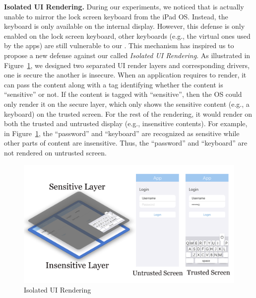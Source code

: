 \textbf{Isolated \ac{UI} Rendering.} During our experiments, we noticed that \tool
is actually unable to mirror the lock screen keyboard from the iPad
OS. Instead, the keyboard is only available on the internal display. However,
this defense is only enabled on the lock screen keyboard, other keyboards
(e.g., the virtual ones used by the apps) are still vulnerable to our \tool.
This mechanism has inspired us to propose a new defense against our \tool
called \emph{Isolated \ac{UI} Rendering}. As illustrated in
Figure~\ref{fig:isolated_ui}, we designed two separated \ac{UI} render layers and corresponding drivers, one
is secure the another is insecure. When an application requires to render, it can
pass the content along with a tag identifying whether the content is
``sensitive'' or not. If the content is tagged with ``sensitive'', then the OS
could only render it on the secure layer, which only shows the sensitive content
(e.g., a keyboard) on the trusted screen. For the rest of the rendering, it
would render on both the trusted and untrusted display (e.g., insensitive
contents).
For example, in Figure~\ref{fig:isolated_ui}, the ``password'' and ``keyboard'' are recognized as sensitive while other parts of content are insensitive. Thus, the ``password'' and ``keyboard'' are not rendered on untrusted screen.

\begin{figure}[t]
	\centering
	\includegraphics[width=\linewidth]{./Figs/isolated_ui.png}
	\caption{Isolated \ac{UI} Rendering}%
	\label{fig:isolated_ui}
\end{figure}
